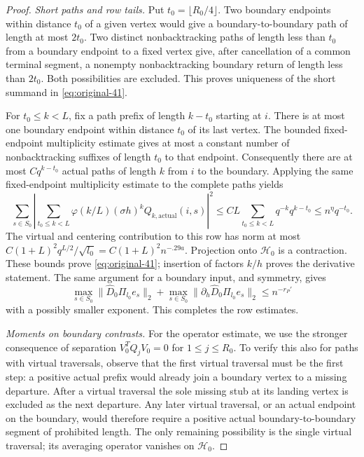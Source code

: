 \begin{proof}
\textit{Short paths and row tails.}
Put $t_0=\lfloor R_0/4\rfloor$.  Two boundary endpoints within distance
$t_0$ of a given vertex would give a boundary-to-boundary path of length
at most $2t_0$.  Two distinct nonbacktracking paths of length less than
$t_0$ from a boundary endpoint to a fixed vertex give, after cancellation
of a common terminal segment, a nonempty nonbacktracking boundary
return of length less than $2t_0$.  Both possibilities are excluded.
This proves uniqueness of the short summand in
\eqref{eq:original-41}.

For $t_0\le k<L$, fix a path prefix of length $k-t_0$ starting at $i$.
There is at most one boundary endpoint within distance $t_0$ of its
last vertex.  The bounded fixed-endpoint multiplicity estimate gives
at most a constant number of nonbacktracking suffixes of length $t_0$
to that endpoint.  Consequently there are at most $Cq^{k-t_0}$ actual
paths of length $k$ from $i$ to the boundary.  Applying the same
fixed-endpoint multiplicity estimate to the complete paths yields
\[
 \sum_{s\in S_0}
 \left|\sum_{t_0\le k<L}\varphi(k/L)(\sigma h)^k
           Q_{k,\mathrm{actual}}(i,s)\right|^2
 \le C L\sum_{t_0\le k<L}q^{-k}q^{k-t_0}
 \le n^\eta q^{-t_0}.
\]
The virtual and centering contribution to this row has norm at most
$C(1+L)^2q^{L/2}/\sqrt{l_0}=C(1+L)^2n^{-.29a}$.
Projection onto $\mathcal H_0$ is a contraction.  These bounds prove
\eqref{eq:original-41}; insertion of factors $k/h$ proves the derivative
statement.  The same argument for a boundary input, and symmetry,
gives
\[
 \max_{s\in S_0}\|\widehat D_0\Pi_{l_0}e_s\|_2
 +\max_{s\in S_0}\|\partial_h\widehat D_0\Pi_{l_0}e_s\|_2
 \le n^{-r_P'}
\]
with a possibly smaller exponent.  This completes the row estimates.

\par\smallskip\noindent
\textit{Moments on boundary contrasts.}
For the operator estimate, we use the stronger consequence of separation
$V_0^TQ_jV_0=0$ for $1\le j\le R_0$.
To verify this also for paths with virtual traversals, observe that
the first virtual traversal must be the first step: a positive actual
prefix would already join a boundary vertex to a missing departure.
After a virtual traversal the sole missing stub at its landing vertex
is excluded as the next departure.  Any later virtual traversal, or
an actual endpoint on the boundary, would therefore require a positive
actual boundary-to-boundary segment of prohibited length.  The only
remaining possibility is the single virtual traversal; its averaging
operator vanishes on $\mathcal H_0$.


\end{proof}

